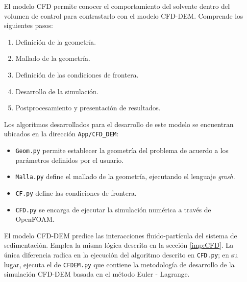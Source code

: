 \noindent
\justify

El modelo CFD permite conocer el comportamiento del solvente dentro del volumen de control para contrastarlo con el modelo CFD-DEM. Comprende los siguientes pasos:

\begin{enumerate}
	\item Definici\'on de la geometr\'ia.
	\item Mallado de la geometr\'ia.
	\item Definici\'on de las condiciones de frontera.
	\item Desarrollo de la simulaci\'on.
	\item Postprocesamiento y presentaci\'on de resultados.
\end{enumerate}

\noindent
\justify

Los algoritmos desarrollados para el desarrollo de este modelo se encuentran ubicados en la direcci\'on \texttt{App/{CFD\_DEM}}:

\begin{itemize}
	\item \texttt{Geom.py} permite establecer la geometr\'ia del problema de acuerdo a los par\'ametros definidos por el usuario.
	\item \texttt{Malla.py} define el mallado de la geometr\'ia, ejecutando el lenguaje \textit{gmsh}.
	\item \texttt{CF.py} define las condiciones de frontera.
	\item \texttt{CFD.py} se encarga de ejecutar la simulaci\'on num\'erica a trav\'es de OpenFOAM.
\end{itemize}

\noindent
\justify

El modelo CFD-DEM predice las interacciones fluido-part\'icula del sistema de sedimentaci\'on. Emplea la misma l\'ogica descrita en la secci\'on \ref{imp:CFD}. La \'unica diferencia radica en la ejecuci\'on del algoritmo descrito en \texttt{CFD.py}; en su lugar, ejecuta el de \texttt{CFDEM.py} que contiene la metodolog\'ia de desarrollo de la simulaci\'on CFD-DEM basada en el m\'etodo Euler - Lagrange.

